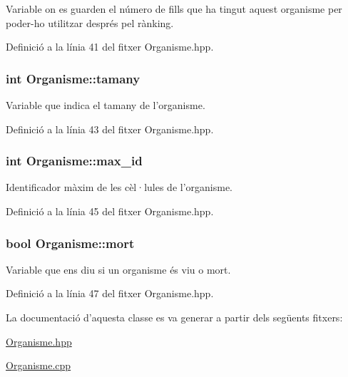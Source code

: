 Variable on es guarden el número de fills que ha tingut aquest organisme per poder-\/ho utilitzar després pel rànking. 



Definició a la línia 41 del fitxer Organisme.\-hpp.

\hypertarget{class_organisme_a5d30992b5ded1a9314aff94ce9fb3932}{
\subsubsection[{tamany}]{\setlength{\rightskip}{0pt plus 5cm}int Organisme\-::tamany\hspace{0.3cm}{\ttfamily [private]}}}\label{class_organisme_a5d30992b5ded1a9314aff94ce9fb3932}


Variable que indica el tamany de l'organisme. 



Definició a la línia 43 del fitxer Organisme.\-hpp.

\hypertarget{class_organisme_ae7f51a74f01cee155cf88a5b01545f78}{
\subsubsection[{max\-\_\-id}]{\setlength{\rightskip}{0pt plus 5cm}int Organisme\-::max\-\_\-id\hspace{0.3cm}{\ttfamily [private]}}}\label{class_organisme_ae7f51a74f01cee155cf88a5b01545f78}


Identificador màxim de les cèl·lules de l'organisme. 



Definició a la línia 45 del fitxer Organisme.\-hpp.

\hypertarget{class_organisme_ae20564db8d9ba5b7547750375010ed7b}{
\subsubsection[{mort}]{\setlength{\rightskip}{0pt plus 5cm}bool Organisme\-::mort\hspace{0.3cm}{\ttfamily [private]}}}\label{class_organisme_ae20564db8d9ba5b7547750375010ed7b}


Variable que ens diu si un organisme és viu o mort. 



Definició a la línia 47 del fitxer Organisme.\-hpp.



La documentació d'aquesta classe es va generar a partir dels següents fitxers\-:\begin{DoxyCompactItemize}
\item 
\hyperlink{_organisme_8hpp}{Organisme.\-hpp}\item 
\hyperlink{_organisme_8cpp}{Organisme.\-cpp}\end{DoxyCompactItemize}
